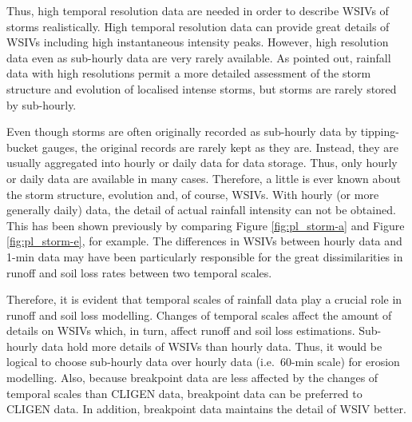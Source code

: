 
Thus, high temporal resolution data are needed in order to describe WSIVs of
storms realistically. High temporal resolution data can provide great details of
WSIVs including high instantaneous intensity peaks. However, high resolution
data even as sub-hourly data are very rarely available.
As \citet{allott2002-73} pointed out, rainfall data with high resolutions permit
a more detailed assessment of the storm structure and evolution of localised
intense storms, but storms are rarely stored by sub-hourly.

Even though storms are often originally recorded as sub-hourly data by
tipping-bucket gauges, the original records are rarely kept as they are.
Instead, they are usually aggregated into hourly or daily data for data storage.
Thus, only hourly or daily data are available in many cases.
Therefore, a little is ever known about the storm structure, evolution and, of
course, WSIVs. With hourly (or more generally daily) data, the detail of
actual rainfall intensity can not be obtained. This has been shown
previously by comparing Figure \ref{fig:pl_storm-a} and Figure
\ref{fig:pl_storm-e}, for example. The differences in WSIVs between hourly data
and 1-min data may have been particularly responsible for the great
dissimilarities in runoff and soil loss rates between two temporal scales.

Therefore, it is evident that temporal scales of rainfall data play a crucial
role in runoff and soil loss modelling. Changes of temporal scales affect the
amount of details on WSIVs which, in turn, affect runoff and soil loss
estimations.
Sub-hourly data hold more details of WSIVs than hourly data. Thus, it would be
logical to choose sub-hourly data over hourly data (i.e.\ 60-min scale) for
erosion modelling. Also, because breakpoint data are less affected by the
changes of temporal scales than CLIGEN data, breakpoint data can be preferred to
CLIGEN data. In addition, breakpoint data maintains the detail of WSIV better.

